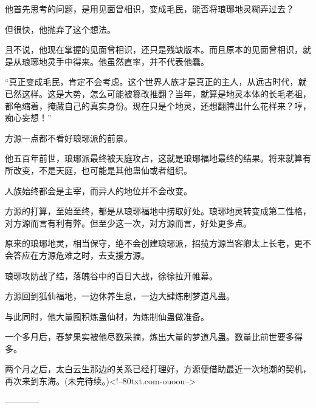 \begin{this_body}
他首先思考的问题，是用见面曾相识，变成毛民，能否将琅琊地灵糊弄过去？

但很快，他抛弃了这个想法。

且不说，他现在掌握的见面曾相识，还只是残缺版本。而且原本的见面曾相识，就是从琅琊地灵手中得来。他虽然直率，并不代表他蠢。

“真正变成毛民，肯定不会考虑。这个世界人族才是真正的主人，从远古时代，就已然这样。这是大势，怎么可能被篡改推翻？当年，就算是地灵本体的长毛老祖，都龟缩着，掩藏自己的真实身份。现在只是个地灵，还想翻腾出什么花样来？哼，痴心妄想！”

方源一点都不看好琅琊派的前景。

他五百年前世，琅琊派最终被天庭攻占，这就是琅琊福地最终的结果。将来就算有所改变，不是天庭，也可能是其他蛊仙或者组织。

人族始终都会是主宰，而异人的地位并不会改变。

方源的打算，至始至终，都是从琅琊福地中捞取好处。琅琊地灵转变成第二性格，对方源而言有利有弊。但至少这一次，对方源而言，好处更多点。

原来的琅琊地灵，相当保守，绝不会创建琅琊派，招揽方源当客卿太上长老，更不会答应在方源危难之时，去支援方源。

琅琊攻防战了结，落魄谷中的百日大战，徐徐拉开帷幕。

方源回到狐仙福地，一边休养生息，一边大肆炼制梦道凡蛊。

与此同时，他大量囤积炼蛊仙材，为炼制仙蛊做准备。

一个多月后，春梦果实被他尽数采摘，炼出大量的梦道凡蛊。数量比前世要多得多。

两个月之后，太白云生那边的关系已经打理好，方源便借助最近一次地潮的契机，再次来到东海。(未完待续。)<!--80txt.com-ouoou-->

------------

\end{this_body}

